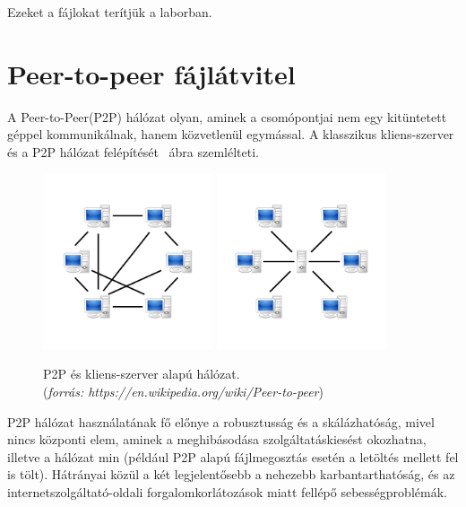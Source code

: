 Ezeket a fájlokat terítjük a laborban.
\section{Peer-to-peer fájlátvitel} 
\label{sect:p2p}
A Peer-to-Peer(P2P) hálózat olyan, aminek a csomópontjai nem egy kitüntetett géppel 
kommunikálnak, hanem közvetlenül egymással. A klasszikus kliens-szerver és a P2P hálózat felépítését
~ábra szemlélteti.

\begin{figure}[ht]
	\centering
	\includegraphics[width=50mm, keepaspectratio]{figures/P2P-network.png}\hspace{1cm}
	\includegraphics[width=50mm, keepaspectratio]{figures/Server-based-network.png}
	\caption{P2P és kliens-szerver alapú hálózat. \\(\textit{forrás: https://en.wikipedia.org/wiki/Peer-to-peer})}
	\label{fig:networkcomparison}
\end{figure}

P2P hálózat használatának fő előnye a robusztusság és a skálázhatóság, mivel nincs központi elem,
aminek a meghibásodása szolgáltatáskiesést okozhatna, illetve a hálózat min (például P2P alapú fájlmegosztás esetén a letöltés mellett fel is tölt). Hátrányai közül a két legjelentősebb a nehezebb karbantarthatóság, és az internetszolgáltató-oldali forgalomkorlátozások miatt fellépő sebességproblémák.

